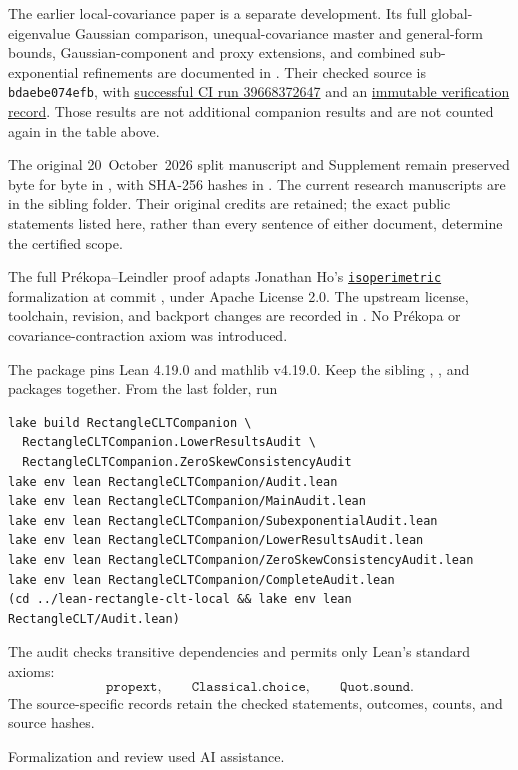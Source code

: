\documentclass[11pt]{article}
\begin{document}
The earlier local-covariance paper is a separate development. Its full
global-eigenvalue Gaussian comparison, unequal-covariance master and
general-form bounds, Gaussian-component and proxy extensions, and
combined sub-exponential refinements are documented in
.
Their checked source is \texttt{bdaebe074efb}, with
\href{https://github.com/VC2015/HDCLTs/actions/runs/39668372647}{successful CI run 39668372647} and an
\href{https://github.com/VC2015/HDCLTs/blob/33bce117aaec07ac000d06df71a482a210882c4f/verification/2026-10-21-refined/README.md}{immutable verification record}.
Those results are not additional companion results and are not counted
again in the table above.

The original 20~October~2026 split manuscript and Supplement remain
preserved byte for byte in , with SHA-256 hashes in
. The current research manuscripts are in
the sibling  folder. Their
original credits are retained; the exact public statements listed here,
rather than every sentence of either document, determine the certified
scope.

The full Pr\'ekopa--Leindler proof adapts Jonathan Ho's
\href{https://github.com/hojonathanho/isoperimetric/tree/29768f8beeaf17295cdf3853d37da35d7e2b0a5f}{\texttt{isoperimetric}}
formalization at commit
, under Apache License
2.0. The upstream license, toolchain, revision, and backport changes are
recorded in . No Pr\'ekopa or
covariance-contraction axiom was introduced.

The package pins Lean 4.19.0 and mathlib v4.19.0. Keep the sibling
, , and 
packages together. From the last folder, run
\begin{verbatim}
lake build RectangleCLTCompanion \
  RectangleCLTCompanion.LowerResultsAudit \
  RectangleCLTCompanion.ZeroSkewConsistencyAudit
lake env lean RectangleCLTCompanion/Audit.lean
lake env lean RectangleCLTCompanion/MainAudit.lean
lake env lean RectangleCLTCompanion/SubexponentialAudit.lean
lake env lean RectangleCLTCompanion/LowerResultsAudit.lean
lake env lean RectangleCLTCompanion/ZeroSkewConsistencyAudit.lean
lake env lean RectangleCLTCompanion/CompleteAudit.lean
(cd ../lean-rectangle-clt-local && lake env lean RectangleCLT/Audit.lean)
\end{verbatim}
The audit checks transitive dependencies and permits only Lean's standard axioms:
\[
 \texttt{propext},\qquad\texttt{Classical.choice},\qquad\texttt{Quot.sound}.
\]
The source-specific records retain the checked statements, outcomes,
counts, and source hashes.

\medskip
\noindent Formalization and review used AI assistance.
\end{document}
